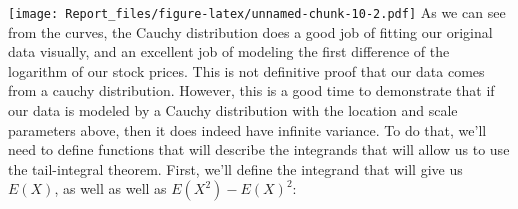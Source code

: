 \documentclass[]{article}
\newenvironment{Shaded}{\begin{snugshade}}{\end{snugshade}}
\newcommand{\CommentTok}[1]{\textcolor[rgb]{0.56,0.35,0.01}{\textit{#1}}}
\newcommand{\DataTypeTok}[1]{\textcolor[rgb]{0.13,0.29,0.53}{#1}}
\newcommand{\DecValTok}[1]{\textcolor[rgb]{0.00,0.00,0.81}{#1}}
\newcommand{\KeywordTok}[1]{\textcolor[rgb]{0.13,0.29,0.53}{\textbf{#1}}}
\newcommand{\NormalTok}[1]{#1}
\newcommand{\OperatorTok}[1]{\textcolor[rgb]{0.81,0.36,0.00}{\textbf{#1}}}
\newcommand{\OtherTok}[1]{\textcolor[rgb]{0.56,0.35,0.01}{#1}}
\newcommand{\StringTok}[1]{\textcolor[rgb]{0.31,0.60,0.02}{#1}}
\begin{document}
\begin{Shaded}
\end{Shaded}

\texttt{[image: Report\_files/figure-latex/unnamed-chunk-10-2.pdf]} As we
can see from the curves, the Cauchy distribution does a good job of
fitting our original data visually, and an excellent job of modeling the
first difference of the logarithm of our stock prices. This is not
definitive proof that our data comes from a cauchy distribution.
However, this is a good time to demonstrate that if our data is modeled
by a Cauchy distribution with the location and scale parameters above,
then it does indeed have infinite variance. To do that, we'll need to
define functions that will describe the integrands that will allow us to
use the tail-integral theorem. First, we'll define the integrand that
will give us \(E(X)\), as well as well as \(E(X^2) - E(X)^2\):
\end{document}
